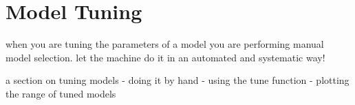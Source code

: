 
\section{Model Tuning} 
\label{advanced:tuning}

when you are tuning the parameters of a model you are performing manual model selection. let the machine do it in an automated and systematic way!

a section on tuning models
- doing it by hand
- using the tune function
- plotting the range of tuned models




